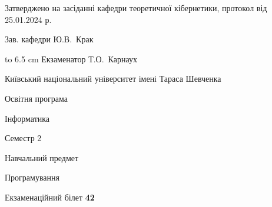 \documentclass[12pt, ukrainian]{article}
\begin{document}
{\smallskip\smallskip \begin {scriptsize} Затверджено на засіданні кафедри теоретичної кібернетики, протокол   від   25.01.2024 р.\par\smallskip\smallskip\smallskip\smallskip
{\parbox {6.5 cm} {Зав. кафедри \dotfill Ю.В.~Крак}}\hspace {0.7cm} {\hbox to 6.5 cm { Екзаменатор \dotfill Т.О.~Карнаух}} \end{scriptsize}}
\newpage
{{\begin {scriptsize}\par
{ \center  Київський національний університет імені Тараса Шевченка \par}
{\parbox {5 cm}{Освітня програма \hfill}{\parbox {7 cm}{Інформатика\hfill}}\parbox {6 cm}{\hfill Семестр 2}}\par
{\parbox {5 cm} {Навчальний предмет \hfill}\parbox {7 cm}{Програмування \hfill}\parbox {6cm}{\hfill}\par}\vspace{-15pt} \end{scriptsize}}{\center Екзаменаційний білет \No \textbf { 42 }\par}}
\end{document}
